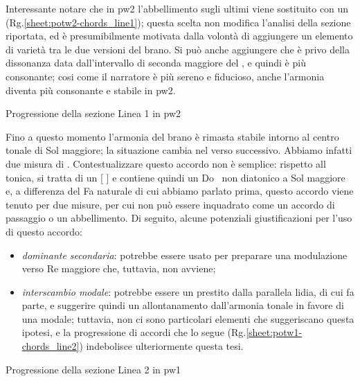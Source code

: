 \documentclass[class=book, crop=false, oneside, 12pt]{standalone}
\begin{document}
    Interessante notare che in \acrshort{pw2} l'abbellimento sugli ultimi  viene sostituito con un  (Rg.\ref{sheet:potw2-chords_line1}); questa scelta non modifica l'analisi della sezione riportata, ed è presumibilmente motivata dalla volontà di aggiungere un elemento di varietà tra le due versioni del brano. Si può anche aggiungere che  è privo della dissonanza data dall'intervallo di seconda maggiore del , e quindi è più consonante; cosi come il narratore  è più sereno e fiducioso, anche l'armonia diventa più consonante e stabile in \acrshort{pw2}.

    \begin{sheet}{Progressione della sezione Linea 1 in \acrshort{pw2}}
        \label{sheet:potw2-chords_line1}
    \end{sheet}
    
    Fino a questo momento l'armonia del brano è rimasta stabile intorno al centro tonale di Sol maggiore; la situazione cambia nel verso successivo. Abbiamo infatti due misura di . Contestualizzare questo accordo non è semplice: rispetto all tonica, si tratta di un [  ] e contiene quindi un Do\sharp~ non diatonico a Sol maggiore e, a differenza del Fa naturale di cui abbiamo parlato prima, questo accordo viene tenuto per due misure, per cui non può essere inquadrato come un accordo di passaggio o un abbellimento. Di seguito, alcune potenziali giustificazioni per l'uso di questo accordo:
    \begin{itemize}
        \item \emph{dominante secondaria}:  potrebbe essere usato per preparare una modulazione verso Re maggiore che, tuttavia, non avviene;
        \item \emph{interscambio modale}:  potrebbe essere un prestito dalla parallela lidia, di cui fa parte, e suggerire quindi un allontanamento dall'armonia tonale in favore di una modale; tuttavia, non ci sono particolari elementi che suggeriscano questa ipotesi, e la progressione di accordi che lo segue (Rg.\ref{sheet:potw1-chords_line2}) indebolisce ulteriormente questa tesi.
    \end{itemize}

    \begin{sheet}{Progressione della sezione Linea 2 in \acrshort{pw1}}
        \label{sheet:potw1-chords_line2}
    \end{sheet}
\end{document}
